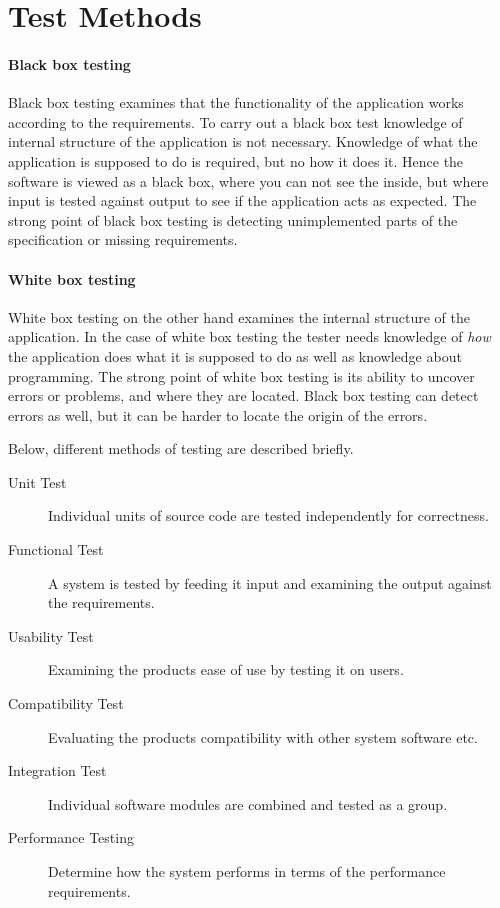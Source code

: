 \section{Test Methods}

\paragraph{Black box testing}

Black box testing examines that the functionality of the application works according to the requirements. To carry out a black box test knowledge of internal structure of the application is not necessary. Knowledge of what the application is supposed to do is required, but no how it does it. Hence the software is viewed as a black box, where you can not see the inside, but where input is tested against output to see if the application acts as expected. The strong point of black box testing is detecting unimplemented parts of the specification or missing requirements.

\paragraph{White box testing}

White box testing on the other hand examines the internal structure of the application. In the case of white box testing the tester needs knowledge of \emph{how} the application does what it is supposed to do as well as knowledge about programming. The strong point of white box testing is its ability to uncover errors or problems, and where they are located. Black box testing can detect errors as well, but it can be harder to locate the origin of the errors.

Below, different methods of testing are described briefly.

\begin{description}
  \item[Unit Test] Individual units of source code are tested independently for correctness.
  \item[Functional Test] A system is tested by feeding it input and examining the output against the requirements.
  \item[Usability Test] Examining the products ease of use by testing it on users.
  \item[Compatibility Test] Evaluating the products compatibility with other system software etc.
  \item[Integration Test] Individual software modules are combined and tested as a group.
  \item[Performance Testing] Determine how the system performs in terms of the performance requirements.
\end{description}